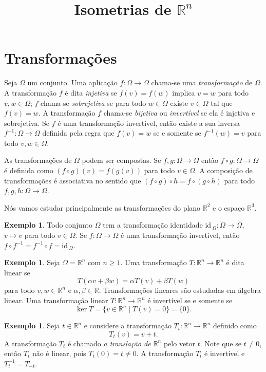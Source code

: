 \documentclass[12pt]{amsart}
\newcommand{\R}{\mathbb R}
\newcommand{\id}{\mbox{id}\,}
\theoremstyle{definition}
\newtheorem{example}[theorem]{Exemplo}
\begin{document}
\title[Isometrias do espaço]{Isometrias de $\R^n$}
\maketitle

\section{Transformações}

Seja $\Omega$ um conjunto. Uma aplicação $f:\Omega\to \Omega$ chama-se uma \emph{transformação} de $\Omega$. A transformação $f$ é dita \emph{injetiva} se $f(v)=f(w)$ implica $v=w$ para todo $v,w\in\Omega$;
$f$ chama-se \emph{sobrejetiva} se para todo $w\in\Omega$ existe $v\in\Omega$ tal que $f(v)=w$. A transformação
$f$ chama-se \emph{bijetiva} ou \emph{invertível} se ela é injetiva e sobrejetiva. Se $f$ é uma transformação 
invertível, então existe a sua inversa $f^{-1}:\Omega\to\Omega$ definida pela regra que 
$f(v)=w$ se e somente se $f^{-1}(w)=v$ para todo $v,w\in\Omega$.  

As transformações de $\Omega$ podem ser compostas. Se $f,g:\Omega\to \Omega$ então $f\circ g:\Omega\to \Omega$ 
é definida como $(f\circ g)(v)=f(g(v))$ para todo $v\in \Omega$. A composição de transformações é associativa no sentido que $(f\circ g)\circ h=f\circ(g\circ h)$ para todo $f,g,h:\Omega\to \Omega$. 

Nós vamos estudar principalmente as transformações do plano $\R^2$ e o espaço $\R^3$. 

\begin{example}
    Todo conjunto $\Omega$ tem a transformação identidade $\id_\Omega:\Omega\to \Omega$, $v\mapsto v$ 
    para todo $v\in\Omega$. Se $f:\Omega\to\Omega$ é uma transformação invertível, então 
    $f\circ f^{-1}=f^{-1}\circ f=\id_\Omega$. 
\end{example}

\begin{example}
    Seja $\Omega=\R^n$ com $n\geq 1$. Uma transformação $T:\R^n\to\R^n$ é dita linear se 
    \[
        T(\alpha v+\beta w)=\alpha T(v)+\beta T(w)
    \]
    para todo $v,w\in\R^n$ e $\alpha,\beta\in\R$. Transformações lineares são estudadas em álgebra linear.
    Uma transformação linear $T:\R^n\to \R^n$ é invertível se e somente se 
    \[
        \ker T=\{v\in \R^n\mid T(v)=0\}=\{0\}.
    \]
\end{example}

\begin{example}
    Seja $t\in\R^n$ e considere a transformação $T_t:\R^n\to \R^n$ definido como 
    \[
        T_t(v)=v+t.
    \]
    A transformação $T_t$ é chamado \emph{a translação de $\R^n$} pelo vetor $t$. Note que se 
    $t\neq 0$, então $T_t$ não é linear, pois $T_t(0)=t\neq 0$. A transformação $T_t$ é invertível e 
    $T_t^{-1}=T_{-t}$. 
\end{example}
\end{document}

